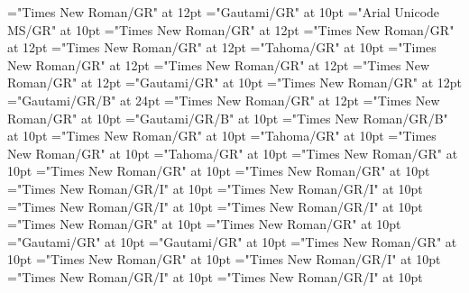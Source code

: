 \documentclass[a4paper]{article}
\begin{document}
\font\xitemxitemLexEntryTypepublishStemEntryTypeAbbreviationPubbefore="Times New Roman/GR" at 12pt
\font\xitemxitemLexSensepublishStemGlossPubLdbefore="Gautami/GR" at 10pt
\font\xitemxitemLexSensepublishStemGlossPubLebefore="Arial Unicode MS/GR" at 10pt
\font\xitemxitempartofspeechbefore="Times New Roman/GR" at 12pt
\font\xitemxitempictureLabelbefore="Times New Roman/GR" at 12pt
\font\xitemxitemprimaryrefsbefore="Times New Roman/GR" at 12pt
\font\xitemxitempronunciationbefore="Tahoma/GR" at 10pt
\font\xitemxitempronunciationsbefore="Times New Roman/GR" at 12pt
\font\sensesensesensesbefore="Times New Roman/GR" at 12pt
\font\xitemxitemtranslationbefore="Times New Roman/GR" at 12pt
\font\xitemxitemtranslationLdbefore="Gautami/GR" at 10pt
\font{}="Times New Roman/GR" at 12pt
\font{}="Gautami/GR/B" at 24pt
\font{}="Times New Roman/GR" at 12pt
\font\entryletData="Times New Roman/GR" at 10pt
\font\headwordggoTeluINentryletData="Gautami/GR/B" at 10pt
\font\spanenheadwordggoTeluINentryletData="Times New Roman/GR/B" at 10pt
\font\pronunciationsentryletData="Times New Roman/GR" at 10pt
\font\pronunciationggofonipaxemicpronunciationsentryletData="Tahoma/GR" at 10pt
\font\spanenpronunciationggofonipaxemicpronunciationsentryletData="Times New Roman/GR" at 10pt
\font\spanggofonipaxemicpronunciationggofonipaxemicpronunciationsentryletData="Tahoma/GR" at 10pt
\font\spanenpronunciationsentryletData="Times New Roman/GR" at 10pt
\font\sensesentryletData="Times New Roman/GR" at 10pt
\font\sensesensesentryletData="Times New Roman/GR" at 10pt
\font\grammaticalinfosensesensesentryletData="Times New Roman/GR/I" at 10pt
\font\partofspeechengrammaticalinfosensesensesentryletData="Times New Roman/GR/I" at 10pt
\font\spanenpartofspeechengrammaticalinfosensesensesentryletData="Times New Roman/GR/I" at 10pt
\font\spanengrammaticalinfosensesensesentryletData="Times New Roman/GR/I" at 10pt
\font{}="Times New Roman/GR" at 10pt
\font\spanendefinitionensensesensesentryletData="Times New Roman/GR" at 10pt
\font\LexSensepublishStemGlossPubLdtesensesensesentryletData="Gautami/GR" at 10pt
\font\spanteLexSensepublishStemGlossPubLdtesensesensesentryletData="Gautami/GR" at 10pt
\font\spanenLexSensepublishStemGlossPubLdtesensesensesentryletData="Times New Roman/GR" at 10pt
\font\spanensensesentryletData="Times New Roman/GR" at 10pt
\font\grammaticalinfoentryletData="Times New Roman/GR/I" at 10pt
\font\partofspeechengrammaticalinfoentryletData="Times New Roman/GR/I" at 10pt
\font\spanenpartofspeechengrammaticalinfoentryletData="Times New Roman/GR/I" at 10pt
\end{document}
